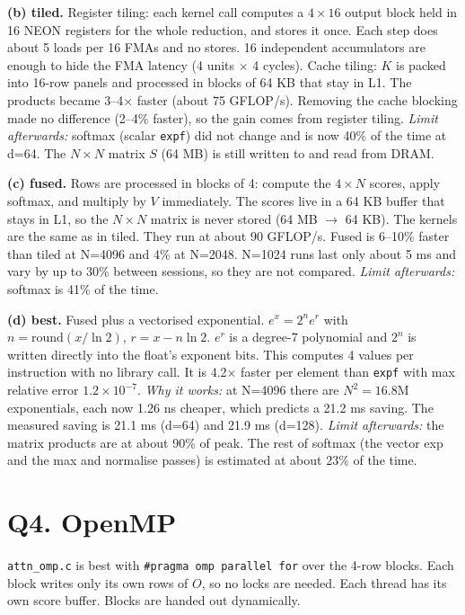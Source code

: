 \documentclass[10pt,a4paper]{article}
\begin{document}
\textbf{(b) tiled.} Register tiling: each kernel call computes a $4\times16$ output block held in 16 NEON registers for the whole reduction, and stores it once. Each step does about 5 loads per 16 FMAs and no stores. 16 independent accumulators are enough to hide the FMA latency (4 units $\times$ 4 cycles). Cache tiling: $K$ is packed into 16-row panels and processed in blocks of 64 KB that stay in L1.
The products became 3--4$\times$ faster (about 75 GFLOP/s). Removing the cache blocking made no difference (2--4\% faster), so the gain comes from register tiling.
\emph{Limit afterwards:} softmax (scalar \texttt{expf}) did not change and is now 40\% of the time at d=64. The $N\times N$ matrix $S$ (64 MB) is still written to and read from DRAM.

\textbf{(c) fused.} Rows are processed in blocks of 4: compute the $4\times N$ scores, apply softmax, and multiply by $V$ immediately. The scores live in a 64 KB buffer that stays in L1, so the $N\times N$ matrix is never stored (64 MB $\rightarrow$ 64 KB). The kernels are the same as in tiled. They run at about 90 GFLOP/s. Fused is 6--10\% faster than tiled at N=4096 and 4\% at N=2048. N=1024 runs last only about 5 ms and vary by up to 30\% between sessions, so they are not compared.
\emph{Limit afterwards:} softmax is 41\% of the time.

\textbf{(d) best.} Fused plus a vectorised exponential. $e^x = 2^n e^r$ with $n=\text{round}(x/\ln2)$, $r = x - n\ln2$. $e^r$ is a degree-7 polynomial and $2^n$ is written directly into the float's exponent bits. This computes 4 values per instruction with no library call. It is 4.2$\times$ faster per element than \texttt{expf} with max relative error $1.2\times10^{-7}$.
\emph{Why it works:} at N=4096 there are $N^2 = 16.8$M exponentials, each now 1.26 ns cheaper, which predicts a 21.2 ms saving. The measured saving is 21.1 ms (d=64) and 21.9 ms (d=128).
\emph{Limit afterwards:} the matrix products are at about 90\% of peak. The rest of softmax (the vector exp and the max and normalise passes) is estimated at about 23\% of the time.

\section*{Q4. OpenMP}

\texttt{attn\_omp.c} is best with \texttt{\#pragma omp parallel for} over the 4-row blocks. Each block writes only its own rows of $O$, so no locks are needed. Each thread has its own score buffer. Blocks are handed out dynamically.
\end{document}
